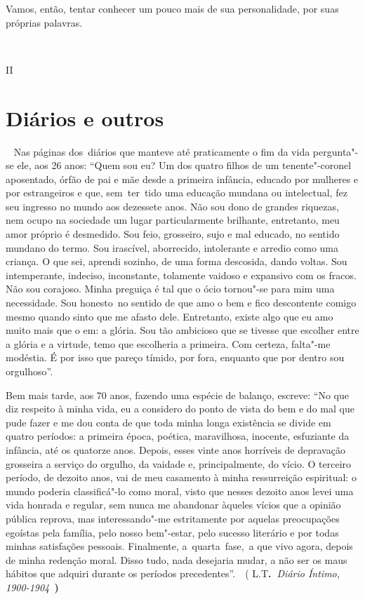 Vamos, então, tentar conhecer um pouco mais de sua personalidade, por
suas próprias palavras.

~

II

\section{Diários e outros}

~ Nas páginas dos~diários que manteve até praticamente o fim da vida
pergunta"-se ele, aos 26 anos: ``Quem sou eu? Um dos quatro filhos de um
tenente"-coronel aposentado, órfão de pai e mãe desde a primeira
infância, educado por mulheres e por estrangeiros e que, sem~ter~tido
uma educação mundana ou intelectual, fez seu ingresso no mundo aos
dezessete anos. Não sou dono de grandes riquezas, nem ocupo na sociedade
um lugar particularmente brilhante, entretanto, meu amor próprio é
desmedido. Sou feio, grosseiro, sujo e mal educado, no sentido mundano
do termo. Sou irascível, aborrecido, intolerante e arredio como uma
criança. O que sei, aprendi sozinho, de uma forma descosida, dando
voltas. Sou intemperante, indeciso, inconstante, tolamente vaidoso e
expansivo com os fracos. Não sou corajoso. Minha preguiça é tal que o
ócio tornou"-se para mim uma necessidade. Sou honesto~no sentido de que
amo o bem e fico descontente comigo mesmo quando sinto que me afasto
dele. Entretanto, existe algo que eu amo muito mais que o em: a glória.
Sou tão ambicioso que se tivesse que escolher entre a glória e a
virtude, temo que escolheria a primeira. Com certeza, falta"-me modéstia.
É por isso que pareço tímido, por fora, enquanto que por dentro sou
orgulhoso''.

Bem mais tarde, aos 70 anos, fazendo uma espécie de balanço, escreve:
``No que diz respeito à minha vida, eu a considero do ponto de vista do
bem e do mal que pude fazer e me dou conta de que toda minha longa
existência se divide em quatro períodos: a primeira época, poética,
maravilhosa, inocente, esfuziante da infância, até os quatorze anos.
Depois, esses vinte anos horríveis de depravação grosseira a serviço do
orgulho, da vaidade e, principalmente, do vício. O terceiro período, de
dezoito anos, vai de meu casamento à minha ressurreição espiritual: o
mundo poderia classificá"-lo como moral, visto que nesses dezoito anos
levei uma vida honrada e regular, sem nunca me abandonar àqueles vícios
que a opinião pública reprova, mas interessando"-me estritamente por
aquelas preocupações egoístas pela família, pelo nosso bem"-estar, pelo
sucesso literário e por todas minhas satisfações pessoais. Finalmente,
a~quarta~fase,~a que vivo agora, depois de minha redenção moral. Disso
tudo, nada desejaria mudar, a não ser os maus hábitos que adquiri
durante os períodos precedentes''.~~( L.T\textbf{.~}\emph{Diário Íntimo,
1900-1904~}\textbf{)}


